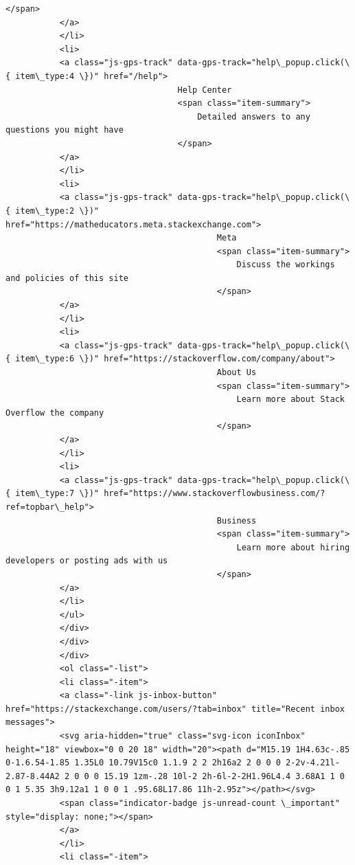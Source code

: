 \documentclass[11pt]{article}
\begin{document}
\begin{Verbatim}[commandchars=\\\{\}]
                                       </span>
           </a>
           </li>
           <li>
           <a class="js-gps-track" data-gps-track="help\_popup.click(\{ item\_type:4 \})" href="/help">
                                   Help Center
                                   <span class="item-summary">
                                       Detailed answers to any questions you might have
                                   </span>
           </a>
           </li>
           <li>
           <a class="js-gps-track" data-gps-track="help\_popup.click(\{ item\_type:2 \})" href="https://matheducators.meta.stackexchange.com">
                                           Meta
                                           <span class="item-summary">
                                               Discuss the workings and policies of this site
                                           </span>
           </a>
           </li>
           <li>
           <a class="js-gps-track" data-gps-track="help\_popup.click(\{ item\_type:6 \})" href="https://stackoverflow.com/company/about">
                                           About Us
                                           <span class="item-summary">
                                               Learn more about Stack Overflow the company
                                           </span>
           </a>
           </li>
           <li>
           <a class="js-gps-track" data-gps-track="help\_popup.click(\{ item\_type:7 \})" href="https://www.stackoverflowbusiness.com/?ref=topbar\_help">
                                           Business
                                           <span class="item-summary">
                                               Learn more about hiring developers or posting ads with us
                                           </span>
           </a>
           </li>
           </ul>
           </div>
           </div>
           </div>
           <ol class="-list">
           <li class="-item">
           <a class="-link js-inbox-button" href="https://stackexchange.com/users/?tab=inbox" title="Recent inbox messages">
           <svg aria-hidden="true" class="svg-icon iconInbox" height="18" viewbox="0 0 20 18" width="20"><path d="M15.19 1H4.63c-.85 0-1.6.54-1.85 1.35L0 10.79V15c0 1.1.9 2 2 2h16a2 2 0 0 0 2-2v-4.21l-2.87-8.44A2 2 0 0 0 15.19 1zm-.28 10l-2 2h-6l-2-2H1.96L4.4 3.68A1 1 0 0 1 5.35 3h9.12a1 1 0 0 1 .95.68L17.86 11h-2.95z"></path></svg>
           <span class="indicator-badge js-unread-count \_important" style="display: none;"></span>
           </a>
           </li>
           <li class="-item">

\end{Verbatim}
\end{document}
